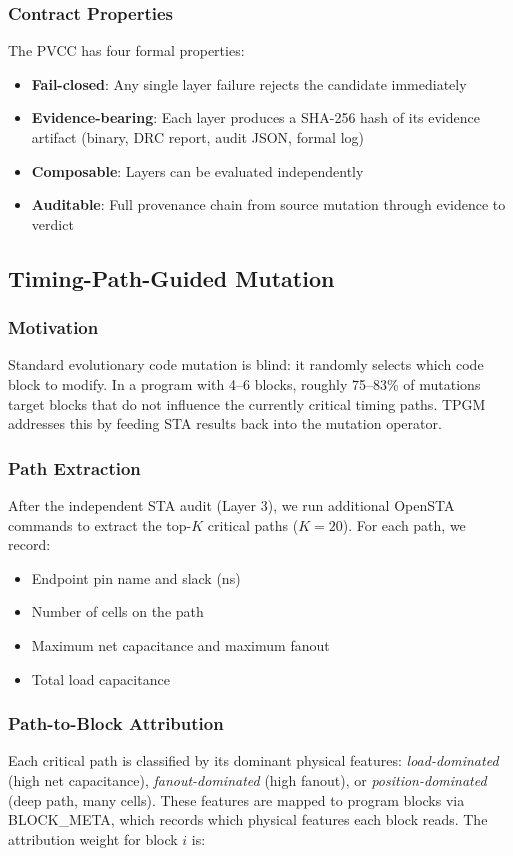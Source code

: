 \documentclass[conference]{IEEEtran}
\begin{document}
\subsubsection{Contract Properties}
The PVCC has four formal properties:
\begin{itemize}
\item \textbf{Fail-closed}: Any single layer failure rejects the candidate immediately
\item \textbf{Evidence-bearing}: Each layer produces a SHA-256 hash of its evidence artifact (binary, DRC report, audit JSON, formal log)
\item \textbf{Composable}: Layers can be evaluated independently
\item \textbf{Auditable}: Full provenance chain from source mutation through evidence to verdict
\end{itemize}

\subsection{Timing-Path-Guided Mutation}

\subsubsection{Motivation}
Standard evolutionary code mutation is blind: it randomly selects which code block to modify. In a program with 4--6 blocks, roughly 75--83\% of mutations target blocks that do not influence the currently critical timing paths. TPGM addresses this by feeding STA results back into the mutation operator.

\subsubsection{Path Extraction}
After the independent STA audit (Layer 3), we run additional OpenSTA commands to extract the top-$K$ critical paths ($K=20$). For each path, we record:
\begin{itemize}
\item Endpoint pin name and slack (ns)
\item Number of cells on the path
\item Maximum net capacitance and maximum fanout
\item Total load capacitance
\end{itemize}

\subsubsection{Path-to-Block Attribution}
Each critical path is classified by its dominant physical features: \textit{load-dominated} (high net capacitance), \textit{fanout-dominated} (high fanout), or \textit{position-dominated} (deep path, many cells). These features are mapped to program blocks via BLOCK\_META, which records which physical features each block reads. The attribution weight for block $i$ is:
\end{document}
